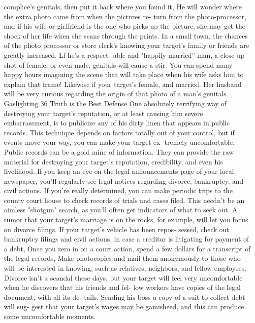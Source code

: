 \documentclass{book}
\begin{document}
complice’s genitals, then put it back where you found it, He will 
wonder where the extra photo came from when the pictures re- 
turn from the photo-processor, and if his wife or girlfriend is 
the one who picks up the picture, she may get the shock of her 
life when she scans through the prints. In a small town, the 
chances of the photo processor or store clerk's knowing your 
target's family or friends are greatly increased. Lf he's a respect- 
able and "happily married” man, a close-up shot of female, or 
even male, genitals will cause a stir. You can spend many 
happy hours imagining the scene that will take place when his 
wife asks him to explain that frame! 
Likewise if your target's female, and married. Her husband 
will be very curious regarding the origin of that photo of a 
man’s genitals.  Gaslighting 
36 
Truth is the Best Defense 
One absolutely terrifying way of destroying your target's 
reputation, or at least causing him severe embarrassment, is to 
publicize any of his dirty linen that appears in public records. 
This technique depends on factors totally out of your control, 
but if events move your way, you can make your target ex- 
tremely uncomfortable. 
Public records can be a gold mine of information. They can 
provide the raw material for destroying your target's reputation, 
credibility, and even his livelihood. If you keep an eye on the 
legal announcements page of your local newspaper, you'll 
regularly see legal notices regarding divorce, bankruptcy, and 
civil actions. If you're really determined, you can make periodic 
trips to the county court house to check records of trials and 
cases filed. This needn't be an aimless "shotgun" search, as 
you'll often get indicators of what to seek out. A rumor that 
your target's marriage is on the rocks, for example, will let you 
focus on divorce filings. If your target's vehicle has been repos- 
sessed, check out bankruptcy filings and civil actions, in case a 
creditor is litigating for payment of a debt, 
Once you zero in on a court action, spend a few dollars for a 
transcript of the legal records, Make photocopies and mail them 
anonymously to those who will be interested in knowing, such 
as relatives, neighbors, and fellow employees. 
Divorce isn't a scandal these days, but your target will feel 
very uncomfortable when he discovers that his friends and fel- 
low workers have copies of the legal document, with all its de- 
tails. Sending his boss a copy of a suit to collect debt will sug- 
gest that your target's wages may be gamisheed, and this can 
produce some uncomfortable moments. 
\end{document}
